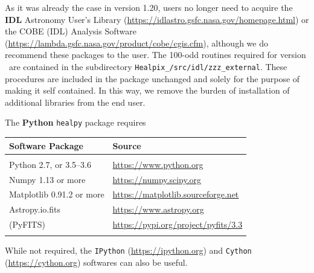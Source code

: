 \documentclass[12pt,twoside]{article}
\begin{document}
As it was already the case in version 1.20, users no longer need to acquire the
\textbf{IDL}
Astronomy User's Library (\url{https://idlastro.gsfc.nasa.gov/homepage.html})
or the COBE (IDL) Analysis Software (\url{https://lambda.gsfc.nasa.gov/product/cobe/cgis.cfm}),
although we do recommend these packages to the user.
The 100-odd routines required for version \hpxversion\ are contained in the
subdirectory \texttt{Healpix\_\hpxversion/src/idl/zzz\_external}.
These procedures are included in the \healpix package unchanged and 
solely for the purpose of making it self contained. In this way,
we remove the burden of installation of additional libraries from 
the end user.

The  \textbf{Python} \texttt{healpy} package requires

\begin{tabular}{p{0.3\hsize} p{0.6\hsize}} \hline  
  \textbf{Software Package} & \textbf{Source} \\ \hline
                            &                          \\ %
Python 2.7, or 3.5--3.6         & \url{https://www.python.org}
			\\
Numpy 1.13 or more         & \url{https://numpy.scipy.org}
			\\
Matplotlib 0.91.2 or more         & \url{https://matplotlib.sourceforge.net}
			\\
Astropy.io.fits         & \url{https://www.astropy.org}
			\\
(PyFITS)         & \url{https://pypi.org/project/pyfits/3.3}
			\\
                                   &                          \\ \hline %
\end{tabular}\vspace{3ex}

While not required, the 
\texttt{IPython} (\url{https://ipython.org})
and 
\texttt{Cython} (\url{https://cython.org})
softwares can also be useful.

%

\end{document}
